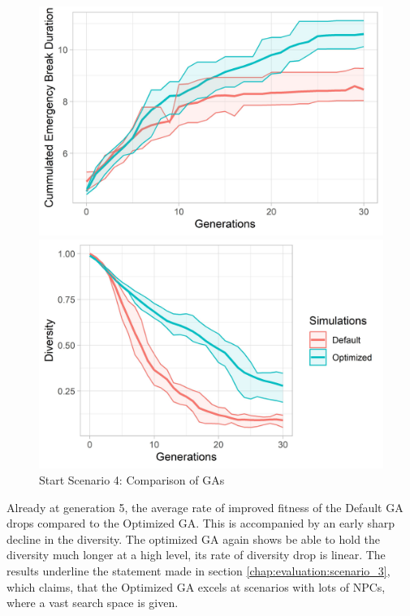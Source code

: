 \begin{figure}[ht] 
	\label{figure:sim_4_ga_comparison}
	\begin{minipage}[b]{0.5\linewidth}
		\centering
		\includegraphics[width=1\linewidth]{simulations/evaluation/plots/sim_4_ga_generations} 
	\end{minipage}%
	\begin{minipage}[b]{0.5\linewidth}
		\centering
		\includegraphics[width=1\linewidth]{simulations/evaluation/plots/sim_4_ga_diversity} 
	\end{minipage} 
	\caption{Start Scenario 4: Comparison of GAs}
\end{figure}


Already at generation 5, the average rate of improved fitness of the Default GA drops compared to the Optimized GA. This is accompanied by an early sharp decline in the diversity. The optimized GA again shows be able to hold the diversity much longer at a high level, its rate of diversity drop is linear.
The results underline the statement made in section \ref{chap:evaluation:scenario_3}, which claims, that the Optimized GA excels at scenarios with lots of NPCs, where a vast search space is given.



